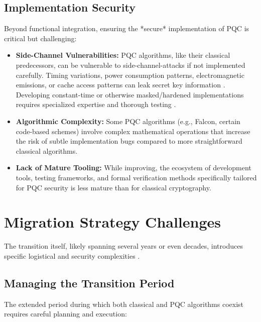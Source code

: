 \subsection{Implementation Security}\label{subsec:impl_security_ch7_rev}
Beyond functional integration, ensuring the *secure* implementation of PQC is critical but challenging:

\begin{itemize}
    \item \textbf{Side-Channel Vulnerabilities:} PQC algorithms, like their classical predecessors, can be vulnerable to \glspl{side-channel-attack} if not implemented carefully. Timing variations, power consumption patterns, electromagnetic emissions, or cache access patterns can leak secret key information \parencite{side_channel_2024}. Developing constant-time or otherwise masked/hardened implementations requires specialized expertise and thorough testing \parencite{implementation_security_2024}.
    \item \textbf{Algorithmic Complexity:} Some PQC algorithms (e.g., Falcon, certain code-based schemes) involve complex mathematical operations that increase the risk of subtle implementation bugs compared to more straightforward classical algorithms.
    \item \textbf{Lack of Mature Tooling:} While improving, the ecosystem of development tools, testing frameworks, and formal verification methods specifically tailored for PQC security is less mature than for classical cryptography.
\end{itemize}
\newpage

\section{Migration Strategy Challenges}\label{sec:migration_ch7_rev}
The transition itself, likely spanning several years or even decades, introduces specific logistical and security complexities \parencite{pqc_migration_2024}.

\subsection{Managing the Transition Period}\label{subsec:transition_ch7_rev}
The extended period during which both classical and PQC algorithms coexist requires careful planning and execution:

